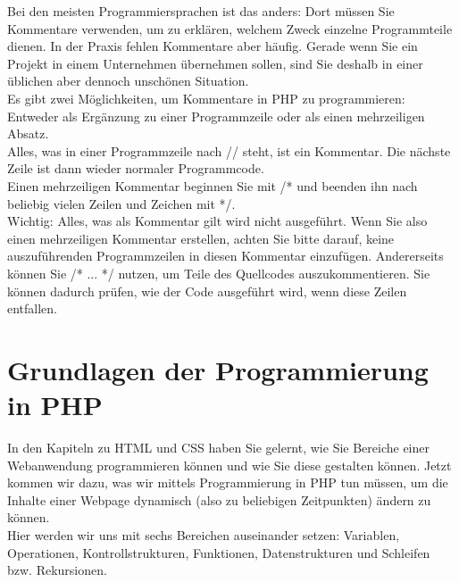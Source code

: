 Bei den meisten Programmiersprachen ist das anders: Dort müssen Sie Kommentare verwenden, um zu erklären, welchem Zweck einzelne Programmteile dienen. In der Praxis fehlen Kommentare aber häufig. Gerade wenn Sie ein Projekt in einem Unternehmen übernehmen sollen, sind Sie deshalb in einer üblichen aber dennoch unschönen Situation.\\

Es gibt zwei Möglichkeiten, um Kommentare in PHP zu programmieren: Entweder als Ergänzung zu einer Programmzeile oder als einen mehrzeiligen Absatz.\\

Alles, was in einer Programmzeile nach // steht, ist ein Kommentar. Die nächste Zeile ist dann wieder normaler Programmcode.\\

Einen mehrzeiligen Kommentar beginnen Sie mit /* und beenden ihn nach beliebig vielen Zeilen und Zeichen mit */.\\

Wichtig: Alles, was als Kommentar gilt wird nicht ausgeführt. Wenn Sie also einen mehrzeiligen Kommentar erstellen, achten Sie bitte darauf, keine auszuführenden Programmzeilen in diesen Kommentar einzufügen. Andererseits können Sie /* ... */ nutzen, um Teile des Quellcodes auszukommentieren. Sie können dadurch prüfen, wie der Code ausgeführt wird, wenn diese Zeilen entfallen.

\section{Grundlagen der Programmierung in PHP}

In den Kapiteln zu HTML und CSS haben Sie gelernt, wie Sie Bereiche einer Webanwendung programmieren können und wie Sie diese gestalten können. Jetzt kommen wir dazu, was wir mittels Programmierung in PHP tun müssen, um die Inhalte einer Webpage dynamisch (also zu beliebigen Zeitpunkten) ändern zu können.\\

Hier werden wir uns mit sechs Bereichen auseinander setzen: Variablen, Operationen, Kontrollstrukturen, Funktionen, Datenstrukturen und Schleifen bzw. Rekursionen.\\

